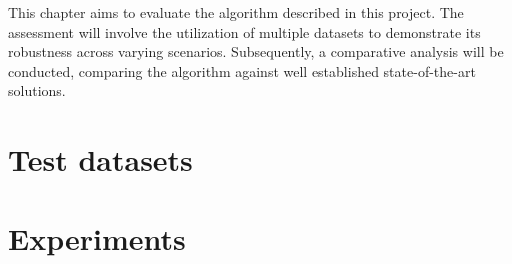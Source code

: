 \documentclass[../main.tex]{subfiles}
\begin{document}
This chapter aims to evaluate the algorithm described in this project. The assessment will involve the utilization of multiple datasets to demonstrate its robustness across varying scenarios. Subsequently, a comparative analysis will be conducted, comparing the algorithm against well established state-of-the-art solutions.

\section{Test datasets}


\section{Experiments}

\end{document}
